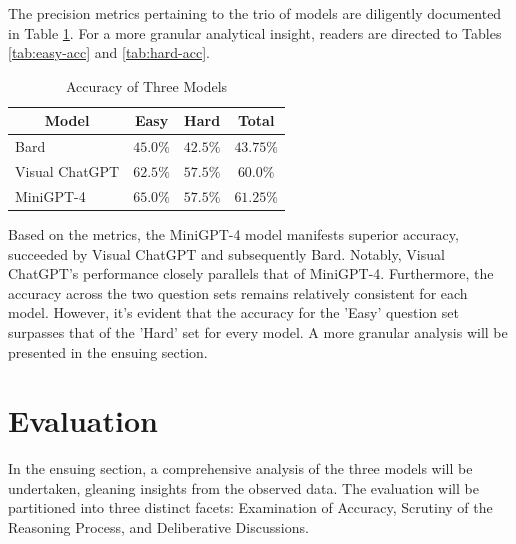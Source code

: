 \documentclass[journal,10pt]{IEEEtran}
\begin{document}
The precision metrics pertaining to the trio of models are diligently documented in Table \ref{tab:accuracy}. For a more granular analytical insight, readers are directed to Tables \ref{tab:easy-acc} and \ref{tab:hard-acc}.
\begin{table}[h]
    \centering
    \caption{Accuracy of Three Models}
    \label{tab:accuracy}
    \begin{tabular}{@{}lccc@{}}
    \toprule
    \multicolumn{1}{c}{Model} & Easy      & Hard & Total \\ \midrule
    Bard                      &  $45.0\%$ & $42.5\%$ &  $43.75\%$ \\
    Visual ChatGPT            &  $62.5\%$ & $57.5\%$ &  $60.0\%$  \\
    MiniGPT-4                 &  $65.0\%$ & $57.5\%$ &  $61.25\%$  \\ \bottomrule
    \end{tabular}
\end{table}

Based on the metrics, the MiniGPT-4 model manifests superior accuracy, succeeded by Visual ChatGPT and subsequently Bard. Notably, Visual ChatGPT's performance closely parallels that of MiniGPT-4. Furthermore, the accuracy across the two question sets remains relatively consistent for each model. However, it's evident that the accuracy for the 'Easy' question set surpasses that of the 'Hard' set for every model. A more granular analysis will be presented in the ensuing section.

\section{Evaluation}
In the ensuing section, a comprehensive analysis of the three models will be undertaken, gleaning insights from the observed data. The evaluation will be partitioned into three distinct facets: Examination of Accuracy, Scrutiny of the Reasoning Process, and Deliberative Discussions.
\end{document}
